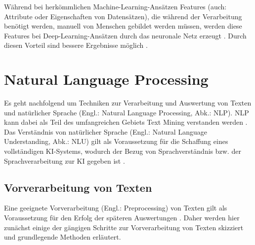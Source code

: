 Während bei herkömmlichen Machine-Learning-Ansätzen Features (auch: Attribute oder Eigenschaften von Datensätzen), die während der Verarbeitung benötigt werden, manuell von Menschen gebildet werden müssen, werden diese Features bei Deep-Learning-Ansätzen durch das neuronale Netz erzeugt \cite[S. 3-4]{Alom}. Durch diesen Vorteil sind bessere Ergebnisse möglich \cite[S. 11]{Alom}. 

\section{Natural Language Processing}

Es geht nachfolgend um Techniken zur Verarbeitung und Auswertung von Texten und natürlicher Sprache (Engl.: Natural Language Processing, Abk.: NLP).  NLP kann dabei als Teil des umfangreichen Gebiets Text Mining verstanden werden \cite[S. 17]{Perez}. Das Verständnis von natürlicher Sprache (Engl.: Natural Language Understanding, Abk.: NLU) gilt als Voraussetzung für die Schaffung eines vollständigen KI-Systems, wodurch der Bezug von Sprachverständnis bzw. der Sprachverarbeitung zur KI gegeben ist \cite[S. 8]{Yampolskiy}.

\subsection{Vorverarbeitung von Texten}

Eine geeignete Vorverarbeitung (Engl.: Preprocessing) von Texten gilt als Voraussetzung für den Erfolg der späteren Auswertungen \cite[S. 46]{Anandarajan}. Daher werden hier zunächst einige der gängigen Schritte zur Vorverarbeitung von Texten skizziert und grundlegende Methoden erläutert.

